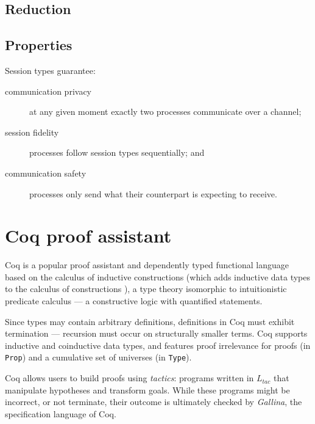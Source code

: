 \documentclass{mproj}
\newcommand{\type}{\texttt}
\begin{document}
\subsection{Reduction}

\subsection{Properties}\label{session-types-properties}

Session types guarantee:

\begin{description}
    \item [communication privacy] at any given moment exactly two processes communicate over a channel;
        
    \item [session fidelity] processes follow session types sequentially; and 
        
    \item [communication safety] processes only send what their counterpart is expecting to receive.
\end{description}
        

\section{Coq proof assistant}\label{coq}

Coq \cite{CoqDeveloperCommunity} is a popular proof assistant and dependently typed functional language based on the calculus of inductive constructions \cite{Coquand1989} (which adds inductive data types to the calculus of constructions \cite{Coquand1985}), a type theory isomorphic to intuitionistic predicate calculus --- a constructive logic with quantified statements.

Since types may contain arbitrary definitions, definitions in Coq must exhibit termination --- recursion must occur on structurally smaller terms. Coq supports inductive and coinductive data types, and features proof irrelevance for proofs (in \type{Prop}) and a cumulative set of universes (in \type{Type}).

Coq allows users to build proofs using \emph{tactics}: programs written in $L_{tac}$ that manipulate hypotheses and transform goals. While these programs might be incorrect, or not terminate, their outcome is ultimately checked by \emph{Gallina}, the specification language of Coq.
\end{document}
